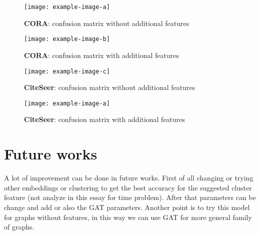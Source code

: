 \documentclass[12pt,conference]{ieeeconf} %
\begin{document}
\begin{figure*}[h!]
    \begin{subfigure}[t]{.4\textwidth}
      \centering
      \texttt{[image: example-image-a]}
      \caption{\textbf{CORA}: confusion matrix without additional features}
    \end{subfigure}
    \hfill
    \begin{subfigure}[t]{.4\textwidth}
      \centering
      \texttt{[image: example-image-b]}
      \caption{\textbf{CORA}: confusion matrix with additional features}
    \end{subfigure}
  
    \medskip
  
    \begin{subfigure}[t]{.4\textwidth}
      \centering
      \texttt{[image: example-image-c]}
      \caption{\textbf{CiteSeer}: confusion matrix without additional features}
    \end{subfigure}
    \hfill
    \begin{subfigure}[t]{.4\textwidth}
      \centering
      \texttt{[image: example-image-a]}
      \caption{\textbf{CiteSeer}: confusion matrix with additional features}
    \end{subfigure}
  \end{figure*}

\section{Future works}
A lot of improvement can be done in future works. 
First of all changing or trying other embeddings or clustering to get the best accuracy for the suggested cluster feature (not analyze in this essay for time problem).
After that parameters can be change and add or also the GAT parameters. 
Another point is to try this model for graphs without features, in this way we can use GAT for more general family of graphs.

\vspace{\fill}
\printbibliography
\newpage
\end{document}
